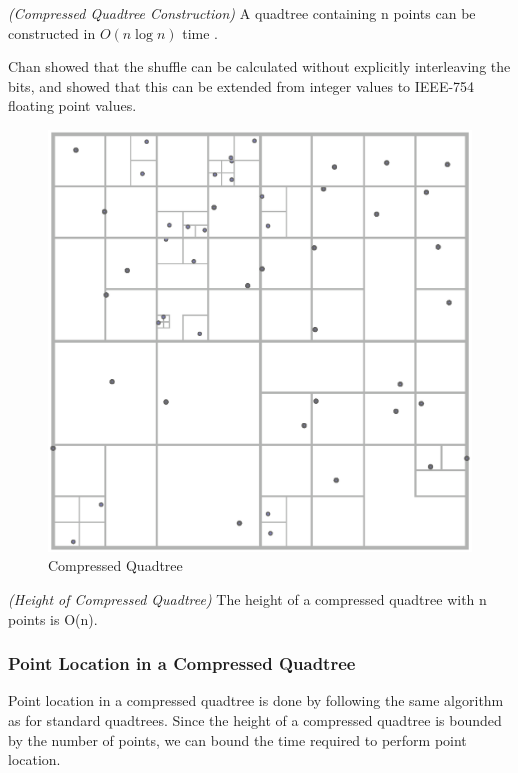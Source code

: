\documentclass[mcs]{scsthesis}
\begin{document}
\begin{thm} \emph{(Compressed Quadtree Construction)}
A quadtree containing n points can be constructed in \(O(n \log n)\) time
\cite{bern}.
\end{thm}

Chan \cite{chan} showed that the shuffle can be calculated without explicitly
interleaving the bits, and \cite{connor} showed that this can be extended from
integer values to IEEE-754 floating point values.

\begin{figure}
\begin{center}
\includegraphics[scale=0.35]{diagrams/compressed_quadtree.eps}
\caption{Compressed Quadtree}
\end{center}
\end{figure}

\begin{thm} \emph{(Height of Compressed Quadtree)}
The height of a compressed quadtree with n points is O(n).
\end{thm}

\subsubsection{Point Location in a Compressed Quadtree}

Point location in a compressed quadtree is done by following the same algorithm
as for standard quadtrees. Since the height of a compressed quadtree is
bounded by the number of points, we can bound the time required to perform
point location.
\end{document}

